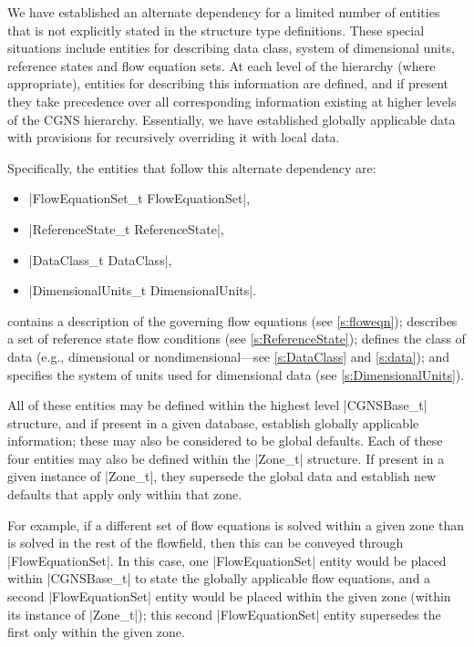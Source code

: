 We have established an alternate dependency for a limited number
of entities that is not explicitly stated in the structure type
definitions.  These special situations include entities for describing
data class, system of dimensional units, reference states and flow
equation sets.  At each level of the hierarchy (where appropriate),
entities for describing this information are defined, and if present
they take precedence over all corresponding information existing at
higher levels of the CGNS hierarchy.  Essentially, we have established
globally applicable data with provisions for recursively overriding it
with local data.

Specifically, the entities that follow this alternate dependency are:
\begin{itemize}
\item |FlowEquationSet_t FlowEquationSet|,
\item |ReferenceState_t ReferenceState|,
\item |DataClass_t DataClass|,
\item |DimensionalUnits_t DimensionalUnits|.
\end{itemize}
 contains a description of the governing flow
equations (see \autoref{s:floweqn});  describes a
set of reference state flow conditions (see \autoref{s:ReferenceState});
 defines the class of data (e.g., dimensional or
nondimensional---see \autoref{s:DataClass} and \autoref{s:data}); and
 specifies the system of units used for
dimensional data (see \autoref{s:DimensionalUnits}).

All of these entities may be defined within the highest level |CGNSBase_t|
structure, and if present in a given database, establish globally applicable
information; these may also be considered to be global defaults.  Each of
these four entities may also be defined within the |Zone_t| structure.  If
present in a given instance of |Zone_t|, they supersede the global data and
establish new defaults that apply only within that zone.

For example, if a different set of flow equations is solved within a
given zone than is solved in the rest of the flowfield, then this can be
conveyed through |FlowEquationSet|.
In this case, one |FlowEquationSet| entity would be placed within
|CGNSBase_t| to state the globally applicable flow equations, and a second
|FlowEquationSet| entity would be placed within the given zone (within its
instance of |Zone_t|); this second |FlowEquationSet| entity supersedes the
first only within the given zone.

